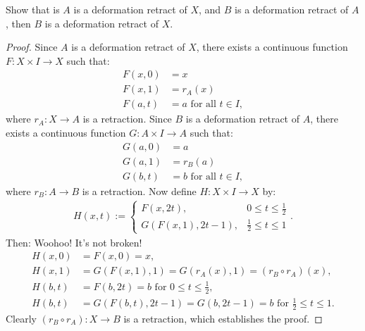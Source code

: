 \documentclass[10pt,oneside,openany]{memoir}
\begin{document}

\begin{exercise}[manual-num = {1}]
	Show that is $A$ is a deformation retract of $X$, and $B$ is a deformation retract of $A$, then $B$ is a deformation retract of $X$.
\end{exercise}
\begin{proof}
Since $A$ is a deformation retract of $X$, there exists a continuous function $F:X\times I \rightarrow X$ such that:
	\begin{equation*}
	\begin{split}
		F(x,0) &= x\\
		F(x,1) &= r_A(x)\\
		F(a,t) &= a \text{ for all $t\in I$},
	\end{split}
	\end{equation*}
where $r_A:X \rightarrow A$ is a retraction. Since $B$ is a deformation retract of $A$, there exists a continuous function $G:A \times I \rightarrow A$ such that:
	\begin{equation*}
	\begin{split}
		G(a,0) &= a \\
		G(a,1) &= r_B(a) \\
		G(b,t) &= b \text{ for all $t \in I$},
	\end{split}
	\end{equation*}
where $r_B:A \rightarrow B$ is a retraction. Now define $H:X \times I \rightarrow X$ by:
	\begin{equation*}
	\begin{split}
		H(x,t):=
		\begin{cases}
			F(x,2t), & 0 \leq t \leq \frac{1}{2} \\
			G(F(x,1),2t-1), & \frac{1}{2} \leq t \leq 1
		\end{cases}.
	\end{split}
	\end{equation*}
Then: Woohoo! It's not broken! 
	\begin{equation*}
	\begin{split}
		H(x,0) &= F(x,0) = x,\\
		H(x,1) &= G(F(x,1),1) = G(r_A(x),1) = (r_B \circ r_A)(x), \\
		H(b,t) &= F(b,2t) = b \text{ for $0 \leq t \leq \frac12$}, \\
		H(b,t) &= G(F(b,t),2t-1) = G(b,2t-1) = b \text{ for $\frac12 \leq t \leq 1$}.
	\end{split}
	\end{equation*}
Clearly $(r_B \circ r_A):X \rightarrow B$ is a retraction, which establishes the proof.
\end{proof}
\end{document}
